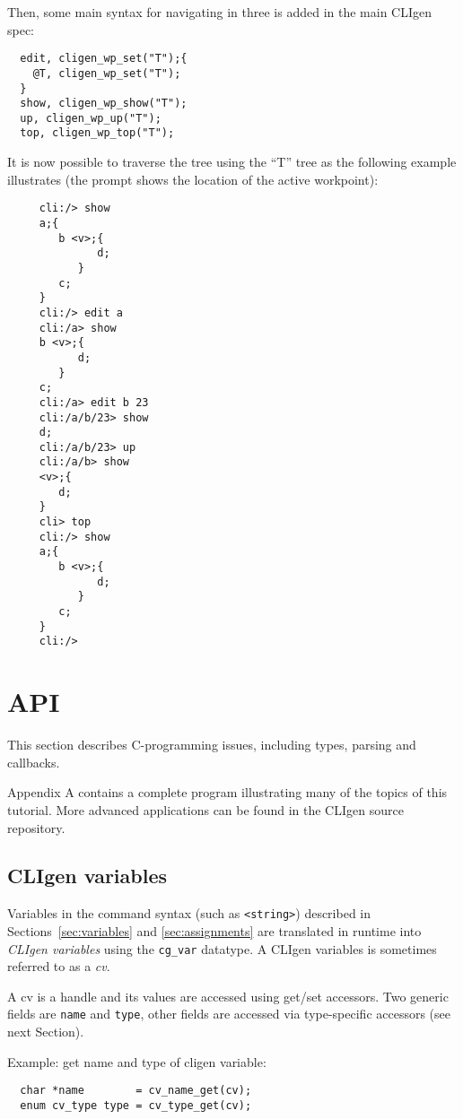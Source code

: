 \documentclass[a4paper, 10pt] {article}
\begin{document}
Then, some main syntax for navigating in three is added in the main CLIgen spec:

\begin{verbatim}
  edit, cligen_wp_set("T");{
    @T, cligen_wp_set("T");
  }
  show, cligen_wp_show("T");
  up, cligen_wp_up("T");
  top, cligen_wp_top("T");
\end{verbatim}

It is now possible to traverse the tree using the ``T'' tree as the following example illustrates (the prompt shows the location of the active workpoint):
\begin{verbatim}
     cli:/> show
     a;{
        b <v>;{
              d;
           }
        c;
     }
     cli:/> edit a
     cli:/a> show
     b <v>;{
           d;
        }
     c;
     cli:/a> edit b 23
     cli:/a/b/23> show
     d;
     cli:/a/b/23> up
     cli:/a/b> show
     <v>;{
        d;
     }
     cli> top
     cli:/> show
     a;{
        b <v>;{
              d;
           }
        c;
     }
     cli:/>
\end{verbatim}

\section{API}
\label{sec:api}
This section describes C-programming issues, including types, parsing and
callbacks.

Appendix A contains a complete program illustrating many of the topics
of this tutorial.  More advanced applications can be found in the CLIgen
source repository.

\subsection{CLIgen variables}

Variables in the command syntax (such as {\tt <string>}) described in
Sections~\ref{sec:variables} and \ref{sec:assignments} are translated
in runtime into \emph{CLIgen variables} using the {\tt cg\_var}
datatype.  A CLIgen variables is sometimes referred to as a \emph{cv}.

A cv is a handle and its values are accessed using get/set
accessors. Two generic fields are {\tt name} and {\tt type}, other
fields are accessed via type-specific accessors (see next Section).

Example: get name and type of cligen variable:
\begin{verbatim}
  char *name        = cv_name_get(cv);
  enum cv_type type = cv_type_get(cv);
\end{verbatim}
\end{document}
